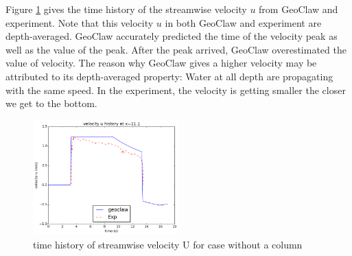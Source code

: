 \documentclass[11pt]{article}
\begin{document}
Figure \ref{fig:velocityU_nocolumn} gives the time history of the streamwise velocity $u$ from GeoClaw and experiment. 
Note that this velocity $u$ in both GeoClaw and experiment are depth-averaged. 
GeoClaw accurately predicted the time of the velocity peak as well as the value of the peak. 
After the peak arrived, GeoClaw overestimated the value of velocity.
The reason why GeoClaw gives a higher velocity may be attributed to its depth-averaged property: Water at all depth are propagating with the same speed. In the experiment, the velocity is getting smaller the closer we get to the bottom. 
\begin{figure}[h!]
    \centering
    \includegraphics[width=0.5\textwidth]{./plots/velocityU_nocolumn}
    \caption{time history of streamwise velocity U for case without a column}
    \label{fig:velocityU_nocolumn}
\end{figure}
\end{document}
